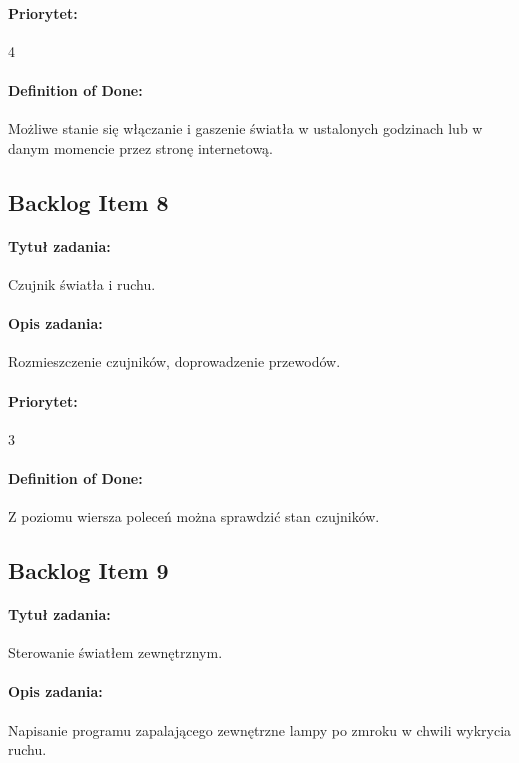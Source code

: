 \paragraph{Priorytet:}
4

\paragraph{Definition of Done:}
Możliwe stanie się włączanie i gaszenie światła w ustalonych godzinach lub w danym momencie przez stronę internetową.


	\subsection{Backlog Item 8}
	\paragraph{Tytuł zadania:}
	Czujnik światła i ruchu.
	
	\paragraph{Opis zadania:} 
	Rozmieszczenie czujników, doprowadzenie przewodów. 
	
	\paragraph{Priorytet:}
	3
	
	\paragraph{Definition of Done:}
	Z poziomu wiersza poleceń można sprawdzić stan czujników.
	


	\subsection{Backlog Item 9}
	\paragraph{Tytuł zadania:}
	Sterowanie światłem zewnętrznym.
	
	\paragraph{Opis zadania:} 
	Napisanie programu zapalającego zewnętrzne lampy po zmroku w chwili wykrycia ruchu. 
	
